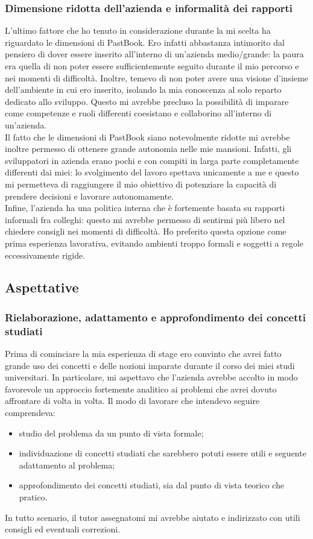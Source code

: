 			\subsubsection{Dimensione ridotta dell'azienda e informalità dei rapporti}
				L'ultimo fattore che ho tenuto in considerazione durante la mi scelta ha riguardato le dimensioni di PastBook. Ero
				infatti abbastanza intimorito dal pensiero di dover essere inserito all'interno di un'azienda medio/grande: la paura
				era quella di non poter essere sufficientemente seguito durante il mio percorso e nei momenti di difficoltà. Inoltre,
				temevo di non poter avere una visione d'insieme dell'ambiente in cui ero inserito, isolando la mia conoscenza al
				solo reparto dedicato allo sviluppo. Questo mi avrebbe precluso la possibilità di imparare come competenze e ruoli
				differenti coesistano e collaborino all'interno di un'azienda.\\
				Il fatto che le dimensioni di PastBook siano notevolmente ridotte mi avrebbe inoltre permesso di ottenere grande
				autonomia nelle mie mansioni. Infatti, gli sviluppatori in azienda erano pochi e con compiti in larga parte
				completamente differenti dai miei: lo svolgimento del lavoro spettava unicamente a me e questo mi permetteva di
				raggiungere il mio obiettivo di potenziare la capacità di prendere decisioni e lavorare autonomamente.\\
				Infine, l'azienda ha una politica interna che è fortemente basata su rapporti informali fra colleghi: questo mi
				avrebbe permesso di sentirmi più libero nel chiedere consigli nei momenti di difficoltà. Ho preferito questa opzione
				come prima esperienza lavorativa, evitando ambienti troppo formali e soggetti a regole eccessivamente rigide.
		\subsection{Aspettative}
			\subsubsection{Rielaborazione, adattamento e approfondimento dei concetti studiati}
				Prima di cominciare la mia esperienza di stage ero convinto che avrei fatto grande uso dei concetti e delle nozioni
				imparate durante il corso dei miei studi universitari. In particolare, mi aspettavo che l'azienda avrebbe accolto
				in modo favorevole un approccio fortemente analitico ai problemi che avrei dovuto affrontare di volta in volta. Il
				modo di lavorare che intendevo seguire comprendeva:
				\begin{itemize}
					\item studio del problema da un punto di vista formale;
					\item individuazione di concetti studiati che sarebbero potuti essere utili e seguente adattamento al
					problema;
					\item approfondimento dei concetti studiati, sia dal punto di vista teorico che pratico.
				\end{itemize}
				In tutto scenario, il tutor assegnatomi mi avrebbe aiutato e indirizzato con utili consigli ed eventuali correzioni.
